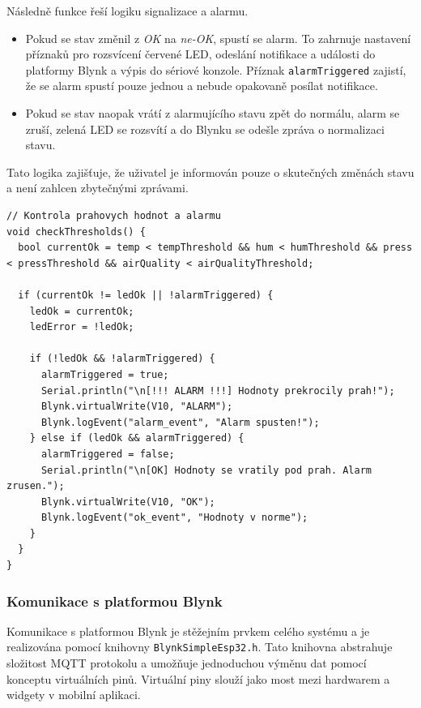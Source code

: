 \documentclass[12pt, twoside]{article} %
\begin{document}
Následně funkce řeší logiku signalizace a alarmu.
\begin{itemize}
    \item Pokud se stav změnil z \textit{OK} na \textit{ne-OK}, spustí se alarm. To zahrnuje nastavení příznaků pro rozsvícení červené LED, odeslání notifikace a události do platformy Blynk a výpis do sériové konzole. Příznak \texttt{alarmTriggered} zajistí, že se alarm spustí pouze jednou a nebude opakovaně posílat notifikace.
    \item Pokud se stav naopak vrátí z alarmujícího stavu zpět do normálu, alarm se zruší, zelená LED se rozsvítí a do Blynku se odešle zpráva o normalizaci stavu.
\end{itemize}
Tato logika zajišťuje, že uživatel je informován pouze o skutečných změnách stavu a není zahlcen zbytečnými zprávami.
\begin{lstlisting}
// Kontrola prahovych hodnot a alarmu
void checkThresholds() {
  bool currentOk = temp < tempThreshold && hum < humThreshold && press < pressThreshold && airQuality < airQualityThreshold;
  
  if (currentOk != ledOk || !alarmTriggered) { 
    ledOk = currentOk;
    ledError = !ledOk;
    
    if (!ledOk && !alarmTriggered) {
      alarmTriggered = true;
      Serial.println("\n[!!! ALARM !!!] Hodnoty prekrocily prah!");
      Blynk.virtualWrite(V10, "ALARM");
      Blynk.logEvent("alarm_event", "Alarm spusten!");
    } else if (ledOk && alarmTriggered) {
      alarmTriggered = false;
      Serial.println("\n[OK] Hodnoty se vratily pod prah. Alarm zrusen.");
      Blynk.virtualWrite(V10, "OK");
      Blynk.logEvent("ok_event", "Hodnoty v norme");
    }
  }
}
\end{lstlisting}
\subsubsection{Komunikace s platformou Blynk}
Komunikace s platformou Blynk je stěžejním prvkem celého systému a je realizována pomocí knihovny \texttt{BlynkSimpleEsp32.h}. Tato knihovna abstrahuje složitost MQTT protokolu a umožňuje jednoduchou výměnu dat pomocí konceptu virtuálních pinů. Virtuální piny slouží jako most mezi hardwarem a widgety v mobilní aplikaci.
\end{document}
